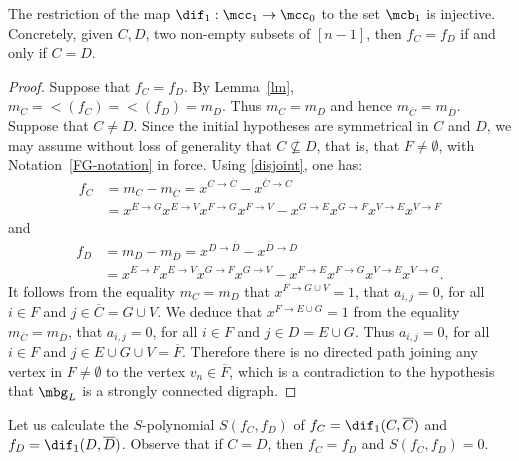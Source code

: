 \begin{lemma}\label{fc=fd}
The restriction of the map $\dif_1:\mcc_1\to\mcc_0$ to the set
$\mcb_1$ is injective. Concretely, given $C,D$, two non-empty subsets
of $[n-1]$, then $f_C=f_D$ if and only if $C=D$.
\end{lemma}
\begin{proof}
Suppose that $f_C=f_D$. By Lemma~\ref{lm},
$m_C=\lt(f_C)=\lt(f_D)=m_D$. Thus $m_C=m_D$ and hence
$m_{\overline{C}}=m_{\overline{D}}$. Suppose that $C\neq D$. Since the
initial hypotheses are symmetrical in $C$ and $D$, we may assume
without loss of generality that $C\not\subseteq D$, that is, that
$F\neq\emptyset$, with Notation~\ref{FG-notation} in force. Using
\eqref{disjoint}, one has:
\begin{align*}
f_C & = m_{C}-m_{\overline{C}}=x^{C\to \overline{C}}-x^{\overline{C}\to C}\\&=
  x^{E\to G}x^{E\to V}x^{F\to G}x^{F\to V}-x^{G\to E}x^{G\to F}x^{V\to
    E}x^{V\to F}
\end{align*}
and 
\begin{align*}
f_D & =  m_{D}-m_{\overline{D}}=x^{D\to \overline{D}}-x^{\overline{D}\to
    D}\\ &= x^{E\to F}x^{E\to V}x^{G\to F}x^{G\to V}-x^{F\to
    E}x^{F\to G}x^{V\to E}x^{V\to G}.
\end{align*}
It follows from the equality $m_C=m_D$ that $x^{F\to G\cup V}=1$,
\ie that $a_{i,j}=0$, for all $i\in F$ and $j\in \overline{C}=G\cup
V$. We deduce that $x^{F\to E\cup G}=1$ from the equality
$m_{\overline{C}}=m_{\overline{D}}$, \ie that $a_{i,j}=0$, for all
$i\in F$ and $j\in D=E\cup G$. Thus $a_{i,j}=0$, for all $i\in F$ and
$j\in E\cup G\cup V=\overline{F}$. Therefore there is no directed path
joining any vertex in $F\neq\emptyset$ to the vertex $v_n\in
\overline{F}$, which is a contradiction to the hypothesis that
$\mbg_L$ is a strongly connected digraph.
\end{proof}

Let us calculate the $S$-polynomial $S(f_C,f_D)$ of
$f_C=\dif_1(C,\overline{C})$ and $f_D=\dif_1(D,\overline{D})$.
Observe that if $C=D$, then $f_C=f_D$ and $S(f_C,f_D)=0$.

